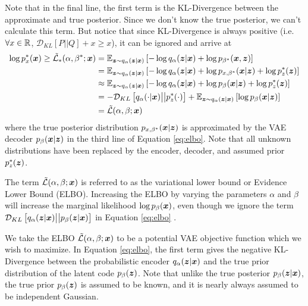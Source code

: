 Note that in the final line, the first term is the KL-Divergence between the approximate and true posterior. Since we don't know the true posterior, we can't calculate this term. But notice that since KL-Divergence is always positive (i.e. $\forall x \in \mathbb{R}$, $\mathcal{D}_{KL}[P \big|\big| Q] + x \geq x$), it can be ignored and arrive at
\begin{equation}
  \begin{split}
    \log p_x^* (\boldsymbol{x}) \geq \tilde{\mathcal{L}}_*(\alpha, \beta^*; \boldsymbol{x})  &= \mathbb{E}_{\boldsymbol{z}\sim q_\alpha(\boldsymbol{z} | \boldsymbol{x})}\left[ -\log q_\alpha(\boldsymbol{z} | \boldsymbol{x}) + \log p_{\beta^*}(\boldsymbol{x}, \boldsymbol{z}) \right] \\
    &= \mathbb{E}_{\boldsymbol{z}\sim q_\alpha(\boldsymbol{z} | \boldsymbol{x})}\left[ -\log q_\alpha(\boldsymbol{z} | \boldsymbol{x}) + \log p_{x,\beta^*}(\boldsymbol{x} | \boldsymbol{z}) + \log p_z^*(\boldsymbol{z}) \right] \\
  &\approx \mathbb{E}_{\boldsymbol{z}\sim q_\alpha(\boldsymbol{z} | \boldsymbol{x})}\left[ -\log q_\alpha(\boldsymbol{z} | \boldsymbol{x}) + \log p_\beta(\boldsymbol{x} | \boldsymbol{z}) + \log p_z^*(\boldsymbol{z}) \right] \\
  &= -\mathcal{D}_{KL}\left[ q_\alpha(\cdot | \boldsymbol{x}) \big|\big| p_z^*(\cdot) \right] + \mathbb{E}_{\boldsymbol{z}\sim q_\alpha(\boldsymbol{z} | \boldsymbol{x})}\left[ \log p_\beta(\boldsymbol{x} | \boldsymbol{z}) \right] \\
  &= \tilde{\mathcal{L}}(\alpha, \beta; \boldsymbol{x})
  \label{eq:elbo}
\end{split}
\end{equation}
where the true posterior distribution $p_{x,\beta^*}(\boldsymbol{x} | \boldsymbol{z})$ is approximated by the VAE decoder $p_\beta(\boldsymbol{x} | \boldsymbol{z})$ in the third line of Equation \ref{eq:elbo}. Note that all unknown distributions have been replaced by the encoder, decoder, and assumed prior $p_z^*(\boldsymbol{z})$.

The term $\tilde{\mathcal{L}}(\alpha, \beta; \boldsymbol{x})$ is referred to as the variational lower bound or Evidence Lower Bound (ELBO). Increasing the ELBO by varying the parameters $\alpha$ and $\beta$ will increase the marginal likelihood $\log p_\beta(\boldsymbol{x})$, even though we ignore the term $\mathcal{D}_{KL}\left[ q_\alpha (\boldsymbol{z} | \boldsymbol{x}) \big|\big| p_\beta(\boldsymbol{z} | \boldsymbol{x}) \right]$ in Equation \ref{eq:elbo} \cite{zhao2017}.

We take the ELBO $\tilde{\mathcal{L}}(\alpha,\beta; \boldsymbol{x})$ to be a potential VAE objective function which we wish to maximize. In Equation \ref{eq:elbo}, the first term gives the negative KL-Divergence between the probabilistic encoder $q_\alpha(\boldsymbol{z} | \boldsymbol{x})$ and the true prior distribution of the latent code $p_\beta(\boldsymbol{z})$. Note that unlike the true posterior $p_\beta(\boldsymbol{z} | \boldsymbol{x})$, the true prior $p_\beta(\boldsymbol{z})$ is assumed to be known, and it is nearly always assumed to be independent Gaussian. 

